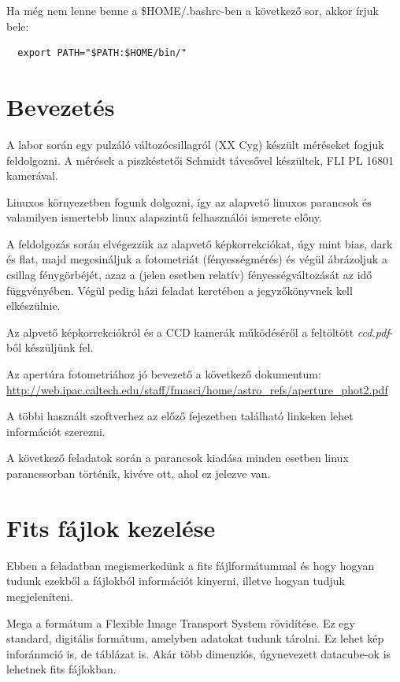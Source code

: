 \documentclass{article}
\begin{document}
Ha még nem lenne benne a \$HOME/.bashrc-ben a következő sor, akkor írjuk bele:
\begin{verbatim}
  export PATH="$PATH:$HOME/bin/"
\end{verbatim}

\section{Bevezetés}

A labor során egy pulzáló változócsillagról (XX Cyg) készült méréseket fogjuk
feldolgozni. A mérések a piszkéstetői Schmidt távcsővel készültek, FLI PL 16801
kamerával.

Linuxos környezetben fogunk dolgozni, így az alapvető linuxos parancsok és
valamilyen ismertebb linux alapszintű felhasználói ismerete előny.

A feldolgozás során elvégezzük az alapvető képkorrekciókat, úgy mint bias, dark
és flat, majd megcsináljuk a fotometriát (fényességmérés) és végül ábrázoljuk a
csillag fénygörbéjét, azaz a (jelen esetben relatív) fényességváltozását az idő
függvényében.
Végül pedig házi feladat keretében a jegyzőkönyvnek kell elkészülnie.

Az alpvető képkorrekciókról és a CCD kamerák működéséről a feltöltött
{\it ccd.pdf}-ből készüljünk fel.

Az apertúra fotometriához jó bevezető a következő dokumentum:
\url{http://web.ipac.caltech.edu/staff/fmasci/home/astro_refs/aperture_phot2.pdf}

A többi használt szoftverhez az előző fejezetben található linkeken lehet
információt szerezni.

A következő feladatok során a parancsok kiadása minden esetben linux
parancssorban történik, kivéve ott, ahol ez jelezve van.

\section{Fits fájlok kezelése}

Ebben a feladatban megismerkedünk a fits fájlformátummal és hogy hogyan tudunk
ezekből a fájlokból információt kinyerni, illetve hogyan tudjuk megjeleníteni.

Mega a formátum a Flexible Image Transport System rövidítése. Ez egy standard,
digitális formátum, amelyben adatokat tudunk tárolni. Ez lehet kép inforánmció
is, de táblázat is. Akár több dimenziós, úgynevezett datacube-ok is lehetnek
fits fájlokban.
\end{document}
